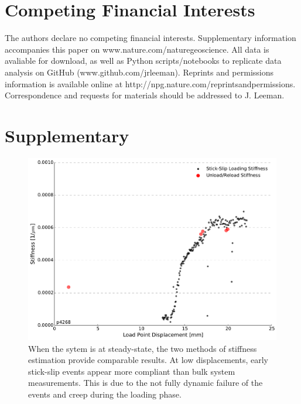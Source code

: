 \documentclass[11pt]{article}
\begin{document}
\section{Competing Financial Interests}
The authors declare no competing financial interests. Supplementary information
accompanies this paper on www.nature.com/naturegeoscience. All data is avaliable
for download, as well as Python scripts/notebooks to replicate data analysis on
GitHub (www.github.com/jrleeman). Reprints and permissions information is
available online at http://npg.nature.com/reprintsandpermissions. Correspondence
and requests for materials should be addressed to J. Leeman.

\section{Supplementary}

\begin{figure}
    \centering
        \includegraphics[scale=0.4]{../Figures/Fig_Stiffness_Methods/Stiffness_Methods.pdf}
       \caption{When the sytem is at steady-state, the two methods of stiffness
       estimation provide comparable results. At low displacements, early stick-slip
       events appear more compliant than bulk system measurements. This is due to the
       not fully dynamic failure of the events and creep during the loading phase.}
      \label{Figure:Stiffness Methods}
\end{figure}
\end{document}
